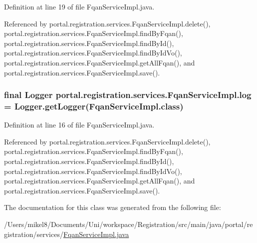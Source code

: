 Definition at line 19 of file FqanServiceImpl.java.



Referenced by portal.registration.services.FqanServiceImpl.delete(), portal.registration.services.FqanServiceImpl.findByFqan(), portal.registration.services.FqanServiceImpl.findById(), portal.registration.services.FqanServiceImpl.findByIdVo(), portal.registration.services.FqanServiceImpl.getAllFqan(), and portal.registration.services.FqanServiceImpl.save().

\hypertarget{classportal_1_1registration_1_1services_1_1FqanServiceImpl_adfc17fa2b1f45e017ab64bb8251454aa}{
\subsubsection[{log}]{\setlength{\rightskip}{0pt plus 5cm}final Logger {\bf portal.registration.services.FqanServiceImpl.log} = Logger.getLogger(FqanServiceImpl.class)}}
\label{classportal_1_1registration_1_1services_1_1FqanServiceImpl_adfc17fa2b1f45e017ab64bb8251454aa}


Definition at line 16 of file FqanServiceImpl.java.



Referenced by portal.registration.services.FqanServiceImpl.delete(), portal.registration.services.FqanServiceImpl.findByFqan(), portal.registration.services.FqanServiceImpl.findById(), portal.registration.services.FqanServiceImpl.findByIdVo(), portal.registration.services.FqanServiceImpl.getAllFqan(), and portal.registration.services.FqanServiceImpl.save().



The documentation for this class was generated from the following file:\begin{DoxyCompactItemize}
\item 
/Users/mikel8/Documents/Uni/workspace/Registration/src/main/java/portal/registration/services/\hyperlink{FqanServiceImpl_8java}{FqanServiceImpl.java}\end{DoxyCompactItemize}
